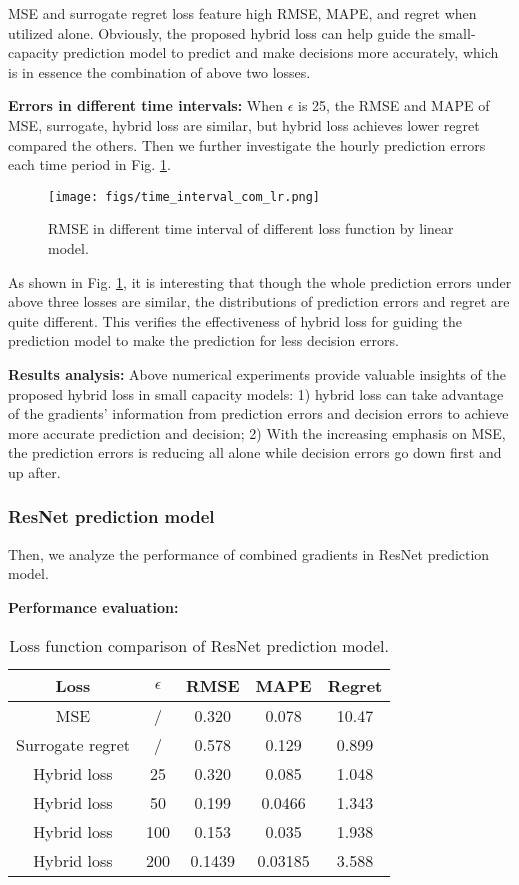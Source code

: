 \documentclass[journal]{IEEEtran}
\begin{document}
MSE and surrogate regret loss feature high RMSE, MAPE, and regret when utilized alone. Obviously, the proposed hybrid loss can help guide the small-capacity prediction model to predict and make decisions more accurately, which is in essence the combination of above two losses.

\textbf{Errors in different time intervals:} 
When $\epsilon$ is 25, the RMSE and MAPE of MSE, surrogate, hybrid loss are similar, but hybrid loss achieves lower regret compared the others. Then we further investigate the hourly prediction errors each time period in Fig. \ref{interval_comparison_linear}. 

\begin{figure}[ht]
  \centering
  \texttt{[image: figs/time\_interval\_com\_lr.png]}
  \caption{RMSE in different time interval of different loss function by linear model.}
  \label{interval_comparison_linear}
\end{figure}

As shown in Fig. \ref{interval_comparison_linear}, it is interesting that though the whole prediction errors under above three losses are similar, the distributions of prediction errors and regret are quite different. This verifies the effectiveness of hybrid loss for guiding the prediction model to make the prediction for less decision errors.

\textbf{Results analysis:} 
Above numerical experiments provide valuable insights of the proposed hybrid loss in small capacity models: 1) hybrid loss can take advantage of the gradients' information from prediction errors and decision errors to achieve more accurate prediction and decision; 2) With the increasing emphasis on MSE, the prediction errors is reducing all alone while decision errors go down first and up after.

\subsubsection{ResNet prediction model}
Then, we analyze the performance of combined gradients in ResNet prediction model. 

\textbf{Performance evaluation:}

\begin{table}[ht]
  \renewcommand{\arraystretch}{1.3}
  \centering
  \label{ResNet_comparison}
  \caption{Loss function comparison of ResNet prediction model.}
  \begin{tabular}{ccccc}
    \hline
    Loss & $\epsilon$ & RMSE & MAPE & Regret \\
    \hline
    MSE & / & 0.320 & 0.078 & 10.47 \\
    Surrogate regret & / & 0.578 & 0.129 & 0.899 \\
    Hybrid loss & 25 & 0.320 & 0.085 & 1.048 \\
    Hybrid loss & 50 & 0.199 & 0.0466 & 1.343  \\
    Hybrid loss & 100 & 0.153 & 0.035 & 1.938  \\
    Hybrid loss & 200 & 0.1439 & 0.03185 & 3.588   \\
    \hline
  \end{tabular}
\end{table}
\end{document}
